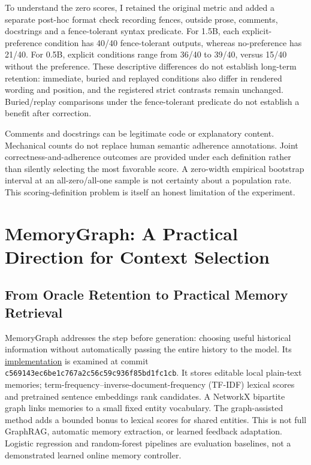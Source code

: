 \documentclass[10pt,a4paper,twocolumn]{article}
\begin{document}
To understand the zero scores, I retained the original metric and added a
separate post-hoc format check recording fences,
outside prose, comments, docstrings and a fence-tolerant syntax predicate.
For 1.5B, each explicit-preference condition has 40/40 fence-tolerant outputs,
whereas no-preference has 21/40. For 0.5B, explicit conditions range from
36/40 to 39/40, versus 15/40 without the preference. These descriptive
differences do not establish long-term retention: immediate, buried and replayed
conditions also differ in rendered wording and position, and the registered
strict contrasts remain unchanged. Buried/replay comparisons under the
fence-tolerant predicate do not establish a benefit after correction.

Comments and docstrings can be legitimate code or explanatory content.
Mechanical counts do not replace human semantic adherence annotations. Joint
correctness-and-adherence outcomes are provided under each definition rather
than silently selecting the most favorable score. A zero-width empirical
bootstrap interval at an all-zero/all-one sample is not certainty about a
population rate. This scoring-definition problem is itself an honest limitation
of the experiment.

\section{MemoryGraph: A Practical Direction for Context Selection}
\subsection{From Oracle Retention to Practical Memory Retrieval}
MemoryGraph addresses the step before generation: choosing useful historical
information without automatically passing the entire history to the model. Its
\href{https://github.com/buildgit17626-ctrl/MemoryGraph}{implementation} is
examined at commit
\texttt{c569143ec6be1c767a2c56c59c936f85bd1fc1cb}. It stores editable local
plain-text memories; term-frequency--inverse-document-frequency (TF-IDF)
lexical scores and pretrained sentence embeddings rank candidates.
A NetworkX bipartite graph links memories to a small fixed entity vocabulary.
The graph-assisted method adds a bounded bonus to lexical scores for shared
entities. This is not full GraphRAG, automatic memory extraction, or learned
feedback adaptation. Logistic regression and random-forest pipelines are
evaluation baselines, not a demonstrated learned online memory controller.
\end{document}
